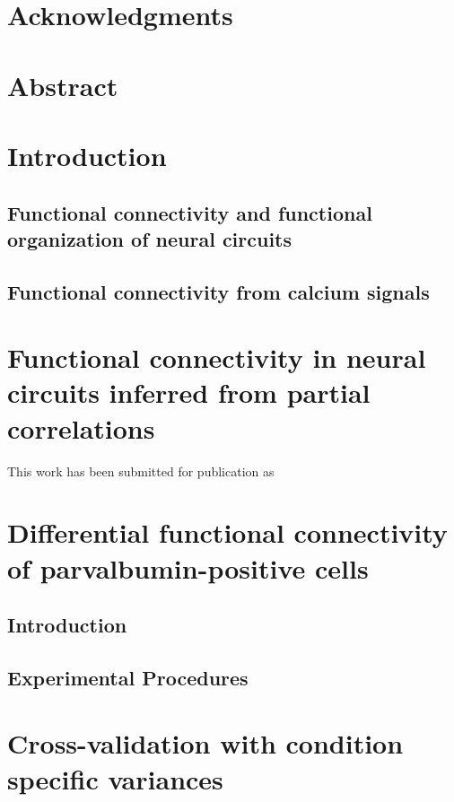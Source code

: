 \documentclass[12pt,letterpaper,titlepage,twoside,openright]{report}
\begin{document}
\chapter*{Acknowledgments}


\chapter*{Abstract}


\tableofcontents

\listoffigures


\chapter{Introduction}
\clearpage 

\section{Functional connectivity and functional organization of neural circuits}

\section{Functional connectivity from calcium signals}

\chapter{Functional connectivity in neural circuits inferred from partial correlations}
This work has been submitted for publication as \citep{Yatsenko:2014}
\clearpage









\chapter{Differential functional connectivity of parvalbumin-positive cells}
\clearpage

\section{Introduction}
\citep{Hofer:2011, Packer:2011}
\section{Experimental Procedures}


\appendix

\chapter{Cross-validation with condition specific variances}


\end{document}
